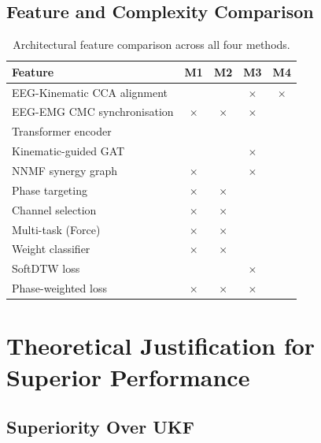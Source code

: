 \documentclass[12pt, a4paper]{article}
\begin{document}
	\subsection{Feature and Complexity Comparison}
	
	\begin{table}[H]
		\centering
		\caption{Architectural feature comparison across all four methods.}
		\label{tab:feature_comp}
		\renewcommand{\arraystretch}{1.3}
		\begin{tabular}{lcccc}
			\toprule
			\textbf{Feature} & \textbf{M1} & \textbf{M2} & \textbf{M3} & \textbf{M4} \\
			\midrule
			EEG-Kinematic CCA alignment  & \checkmark & \checkmark & $\times$   & $\times$ \\
			EEG-EMG CMC synchronisation  & $\times$   & $\times$   & $\times$   & \checkmark \\
			Transformer encoder  & \checkmark & \checkmark & \checkmark & \checkmark \\
			Kinematic-guided GAT & \checkmark & \checkmark & $\times$   & \checkmark \\
			NNMF synergy graph   & $\times$   & \checkmark & $\times$   & \checkmark \\
			Phase targeting      & $\times$   & $\times$   & \checkmark & \checkmark \\
			Channel selection    & $\times$   & $\times$   & \checkmark & \checkmark \\
			Multi-task (Force)   & $\times$   & $\times$   & \checkmark & \checkmark \\
			Weight classifier    & $\times$   & $\times$   & \checkmark & \checkmark \\
			SoftDTW loss         & \checkmark & \checkmark & $\times$   & \checkmark \\
			Phase-weighted loss  & $\times$   & $\times$   & $\times$   & \checkmark \\
			\bottomrule
		\end{tabular}
	\end{table}
	
	\section{Theoretical Justification for Superior Performance}
	
	\subsection{Superiority Over UKF}
	
\end{document}
